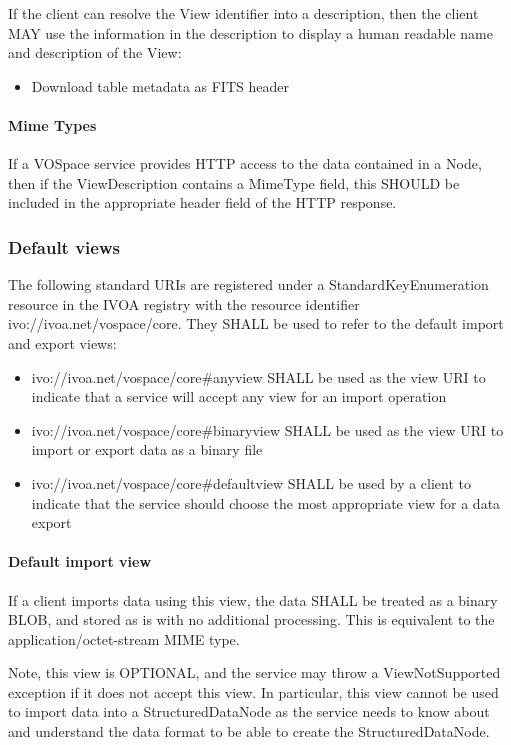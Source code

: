 \documentclass[11pt,a4paper]{ivoa}
\begin{document}
If the client can resolve the View identifier into a description, then the client MAY use the information in the description to display a human readable name and description of the View:

\begin{itemize}
    \item Download table metadata as FITS header
\end{itemize}

\paragraph{Mime Types}
If a VOSpace service provides HTTP access to the data contained in a Node, then if the ViewDescription contains a MimeType field, this SHOULD be included in the appropriate header field of the HTTP response.

\subsubsection{Default views}
\label{subsubsec:default views}
The following standard URIs are registered under a StandardKeyEnumeration resource \citep{std:STDREGEXT} in the IVOA registry with the resource identifier ivo://ivoa.net/vospace/core. They SHALL be used to refer to the default import and export views:

\begin{itemize}
    \item ivo://ivoa.net/vospace/core\#anyview SHALL be used as the view URI to indicate that a service will accept any view for an import operation
    \item ivo://ivoa.net/vospace/core\#binaryview SHALL be used as the view URI to import or export data as a binary file
    \item ivo://ivoa.net/vospace/core\#defaultview SHALL be used by a client to indicate that the service should choose the most appropriate view for a data export
\end{itemize}

\paragraph{Default import view}
If a client imports data using this view, the data SHALL be treated as a binary BLOB, and stored as is with no additional processing. This is equivalent to the application/octet-stream MIME type.

Note, this view is OPTIONAL, and the service may throw a ViewNotSupported exception if it does not accept this view. In particular, this view cannot be used to import data into a StructuredDataNode as the service needs to know about and understand the data format to be able to create the StructuredDataNode.
\end{document}
